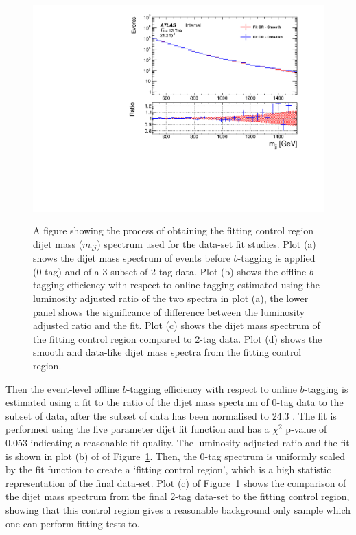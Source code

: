 \begin{figure}[!htb]
{  \includegraphics[width=0.51\linewidth, angle=0]{figs/Dibjet/LowMass/FitStudy/corrFitCR_smooth_dataLike.pdf}
}
\hspace{-2mm}
\vspace{10pt}
\caption{\label{fig:fittingCR}
  A figure showing the process of obtaining the fitting control region dijet mass ($m_{jj}$) spectrum
  used for the \lm{} data-set fit studies.
  Plot (a) shows the dijet mass spectrum of events before $b$-tagging is applied (0-tag) and of a 3 \ifb{} subset of 2-tag data.
  Plot (b) shows the offline $b$-tagging efficiency with respect to online tagging estimated using the luminosity adjusted ratio of the two spectra in plot (a),
  the lower panel shows the significance of difference between the luminosity adjusted ratio and the fit.
  Plot (c) shows the dijet mass spectrum of the fitting control region compared to 2-tag data.
  Plot (d) shows the smooth and data-like dijet mass spectra from the fitting control region.
}
\end{figure}

Then the event-level offline $b$-tagging efficiency with respect to online $b$-tagging is estimated using a fit to the ratio
of the dijet mass spectrum of 0-tag data to the subset of data, after the subset of data has been normalised to 24.3 \ifb{}.
The fit is performed using the five parameter dijet fit function and has a $\chi^2$ p-value of 0.053 indicating a reasonable fit quality.
The luminosity adjusted ratio and the fit is shown in plot (b) of of Figure~\ref{fig:fittingCR}.
Then, the 0-tag spectrum is uniformly scaled by the fit function to create a `fitting control region', which is a high statistic representation of the final data-set.
Plot (c) of Figure~\ref{fig:fittingCR} shows the comparison of the dijet mass spectrum from the final 2-tag data-set to the fitting control region,
showing that this control region gives a reasonable background only sample which one can perform fitting tests to.

